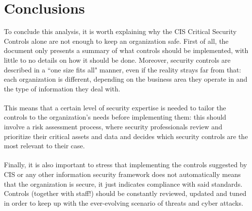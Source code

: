 \section{Conclusions}
	 To conclude this analysis, it is worth explaining why the CIS Critical Security Controls alone are not enough to keep an organization safe. First of all, the document only presents a summary of what controls should be implemented, with little to no details on how it should be done. Moreover, security controls are described in a ``one size fits all" manner, even if the reality strays far from that: each organization is different, depending on the business area they operate in and the type of information they deal with.\\\\
	 This means that a certain level of security expertise is needed to tailor the controls to the organization's needs before implementing them: this should involve a risk assessment process, where security professionals review and prioritize their critical assets and data and decides which security controls are the most relevant to their case.\\\\
	 Finally, it is also important to stress that implementing the controls suggested by CIS or any other information security framework does not automatically means that the organization is secure, it just indicates compliance with said standards. Controls (together with staff!) should be constantly reviewed, updated and tuned in order to keep up with the ever-evolving scenario of threats and cyber attacks.